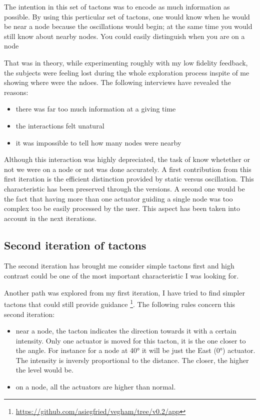 The intention in this set of tactons was to encode as much information
as possible. By using this perticular set of tactons, one would know
when he would be near a node because the oscillations would begin; at
the same time you would still know about nearby nodes. You could easily
distinguish when you are on a node

That was in theory, while experimenting roughly with my low fidelity
feedback, the subjects were feeling lost during the whole exploration
process inspite of me showing where were the ndoes. The following
interviews have revealed the reasons:

\begin{itemize}
\item
  there was far too much information at a giving time
\item
  the interactions felt unatural
\item
  it was impossible to tell how many nodes were nearby
\end{itemize}

Although this interaction was highly depreciated, the task of know
whetether or not we were on a node or not was done accurately. A first
contribution from this first iteration is the efficient distinction
provided by static versus oscillation. This characteristic has been
preserved through the versions. A second one would be the fact that
having more than one actuator guiding a single node was too complex too
be easily processed by the user. This aspect has been taken into account
in the next iterations.

\subsection{Second iteration of
tactons}\label{second-iteration-of-tactons}

The second iteration has brought me consider simple tactons first and
high contrast could be one of the most important characteristic I was
looking for.

Another path was explored from my first iteration, I have tried to find
simpler tactons that could still provide guidance \footnote{\url{https://github.com/asiegfried/vegham/tree/v0.2/app}}.
The following rules concern this second iteration:

\begin{itemize}
\item
  near a node, the tacton indicates the direction towards it with a
  certain intensity. Only one actuator is moved for this tacton, it is
  the one closer to the angle. For instance for a node at 40° it will be
  just the East (0°) actuator. The intensity is inversly proportional to
  the distance. The closer, the higher the level would be.
\item
  on a node, all the actuators are higher than normal.
\end{itemize}

